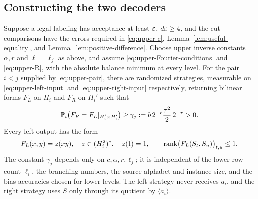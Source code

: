 \subsection{Constructing the two decoders}

\begin{proposition}
\label{prop:upper}
Suppose a legal labeling has acceptance at least $\varepsilon$, $d\varepsilon\ge4$,
and the cut comparisons have the errors required in
\eqref{eq:upper-c}, Lemma~\ref{lem:useful-equality}, and
Lemma~\ref{lem:positive-difference}.  Choose upper inverse constants
$\alpha,r$ and $\ell=\ell_j$ as above, and assume
\eqref{eq:upper-Fourier-conditions} and \eqref{eq:upper-R}, with the
absolute balance minimum at every level.  For the pair $i<j$ supplied by
\eqref{eq:upper-pair}, there are randomized strategies, measurable on
\eqref{eq:upper-left-input} and \eqref{eq:upper-right-input} respectively,
returning bilinear forms $F_L$ on $H_i$ and $F_R$ on $H_i'$ such that
\begin{equation}\label{eq:upper-gamma}
 \mathbb P_i\bigl(F_R=F_L|_{H_i'\times H_i'}\bigr)\ge
 \gamma_j:=b\,2^{-\ell}\frac{\tau^2}{2}\,2^{-r}>0.
\end{equation}
Every left output has the form
\[
 F_L(x,y)=z(xy),\quad z\in(H_i^2)^*,\quad z(1)=1,
 \qquad \operatorname{rank}\bigl(F_L(S_t,S_u)\bigr)_{t,u}\le1.
\]
The constant $\gamma_j$ depends only on $c,\alpha,r,\ell_j$; it is
independent of the lower row count $\ell_i$, the branching numbers, the
source alphabet and instance size, and the bias accuracies chosen for
lower levels.  The left strategy never receives $a_i$, and the right
strategy uses $S$ only through its quotient by $\langle a_i\rangle$.
\end{proposition}

